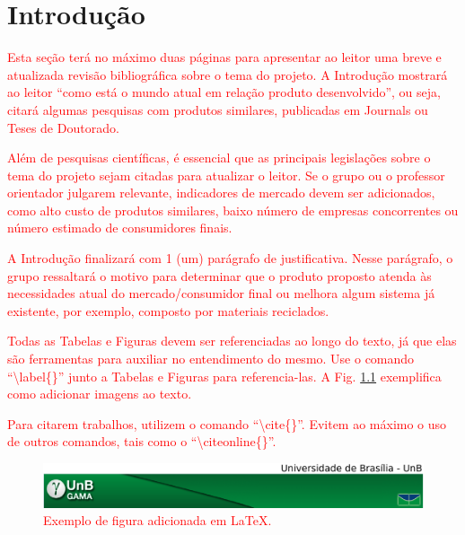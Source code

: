 \chapter[Introdução]{Introdução}

\textcolor{red}{Esta seção terá no máximo duas páginas para apresentar ao leitor uma breve e atualizada revisão bibliográfica sobre o tema do projeto. A Introdução mostrará ao leitor “como está o mundo atual em relação produto desenvolvido”, ou seja, citará algumas pesquisas com produtos similares, publicadas em Journals ou Teses de Doutorado.}




\textcolor{red}{Além de pesquisas científicas, é essencial que as principais legislações sobre o tema do projeto sejam citadas para atualizar o leitor. Se o grupo ou o professor orientador julgarem relevante, indicadores de mercado devem ser adicionados, como alto custo de produtos similares, baixo número de empresas concorrentes ou número estimado de consumidores finais.}

\textcolor{red}{A Introdução finalizará com 1 (um) parágrafo de justificativa. Nesse parágrafo, o grupo ressaltará o motivo para determinar que o produto proposto atenda às necessidades atual do mercado/consumidor final ou melhora algum sistema já existente, por exemplo, composto por materiais reciclados.}

\textcolor{red}{Todas as Tabelas e Figuras devem ser referenciadas ao longo do texto, já que elas são ferramentas para auxiliar no entendimento do mesmo. Use o comando ``\textsf{\textbackslash label\{\}}'' junto a Tabelas e Figuras para referencia-las. A Fig. \ref{fig:exemplo_fig} exemplifica como adicionar imagens ao texto.}

\textcolor{red}{Para citarem trabalhos, utilizem o comando ``\textsf{\textbackslash cite\{\}}''. Evitem ao máximo o uso de outros comandos, tais como o ``\textsf{\textbackslash citeonline\{\}}''.}

\begin{figure}[htpb]
\centering
\includegraphics[width=\textwidth]{figuras/fga.png}
\caption{\textcolor{red}{Exemplo de figura adicionada em \LaTeX.}}
\label{fig:exemplo_fig}
\end{figure}

